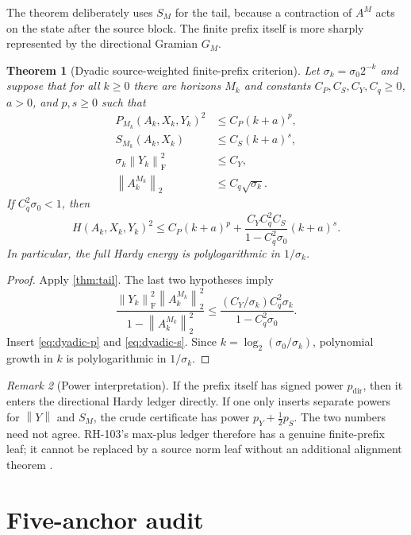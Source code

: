 \documentclass[11pt]{article}
\newtheorem{theorem}{Theorem}[section]
\theoremstyle{definition}
\theoremstyle{remark}
\newtheorem{remark}[theorem]{Remark}
\newcommand{\norm}[1]{\left\lVert#1\right\rVert}
\newcommand{\F}{\mathrm F}
\begin{document}
The theorem deliberately uses $S_M$ for the tail, because a contraction of
$A^M$ acts on the state after the source block.  The finite prefix itself is
more sharply represented by the directional Gramian $G_M$.

\begin{theorem}[Dyadic source-weighted finite-prefix criterion]
 \label{thm:dyadic}
 Let $\sigma_k=\sigma_0 2^{-k}$ and suppose that for all $k\ge0$ there are
 horizons $M_k$ and constants $C_P,C_S,C_Y,C_q\ge0$, $a>0$, and $p,s\ge0$
 such that
 \begin{align}
 P_{M_k}(A_k,X_k,Y_k)^2&\le C_P(k+a)^p,
 \label{eq:dyadic-p}\\
 S_{M_k}(A_k,X_k)&\le C_S(k+a)^s,
 \label{eq:dyadic-s}\\
 \sigma_k\norm{Y_k}_{\F}^2&\le C_Y,
 \label{eq:dyadic-y}\\
 \norm{A_k^{M_k}}_2&\le C_q\sqrt{\sigma_k}.
 \label{eq:dyadic-q}
 \end{align}
 If $C_q^2\sigma_0<1$, then
 \begin{equation}
 H(A_k,X_k,Y_k)^2
 \le C_P(k+a)^p
 +\frac{C_YC_q^2C_S}{1-C_q^2\sigma_0}(k+a)^s.
 \label{eq:dyadic-full}
 \end{equation}
 In particular, the full Hardy energy is polylogarithmic in
 $1/\sigma_k$.
\end{theorem}

\begin{proof}
 Apply \cref{thm:tail}.  The last two hypotheses imply
 \[
 \frac{\norm{Y_k}_{\F}^2\norm{A_k^{M_k}}_2^2}
      {1-\norm{A_k^{M_k}}_2^2}
 \le
 \frac{(C_Y/\sigma_k)C_q^2\sigma_k}
      {1-C_q^2\sigma_0}.
 \]
 Insert \eqref{eq:dyadic-p} and \eqref{eq:dyadic-s}.  Since
 $k=\log_2(\sigma_0/\sigma_k)$, polynomial growth in $k$ is
 polylogarithmic in $1/\sigma_k$.
\end{proof}

\begin{remark}[Power interpretation]
 If the prefix itself has signed power $p_\mathrm{dir}$, then it enters the
 directional Hardy ledger directly.  If one only inserts separate powers for
 $\norm Y$ and $S_M$, the crude certificate has power
 $p_Y+\tfrac12p_S$.  The two numbers need not agree.  RH-103's max-plus
 ledger therefore has a genuine finite-prefix leaf; it cannot be replaced by
 a source norm leaf without an additional alignment theorem
 \citep{WangPowerLedger2026}.
\end{remark}

\section{Five-anchor audit}
\label{sec:audit}
\end{document}
